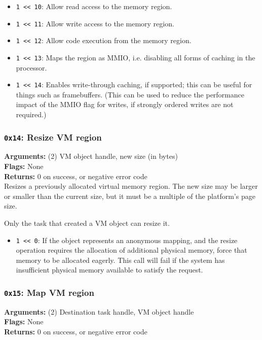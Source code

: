 \documentclass[11pt]{article}
\begin{document}
\begin{itemize}
\item \texttt{1 << 10}: Allow read access to the memory region.
\item \texttt{1 << 11}: Allow write access to the memory region.
\item \texttt{1 << 12}: Allow code execution from the memory region.
\item \texttt{1 << 13}: Maps the region as MMIO, i.e. disabling all forms of caching in the processor.
\item \texttt{1 << 14}: Enables write-through caching, if supported; this can be useful for things such as framebuffers. (This can be used to reduce the performance impact of the MMIO flag for writes, if strongly ordered writes are not required.)
\end{itemize}

\subsubsection{{\tt 0x14}: Resize VM region}
\textbf{Arguments:} (2) VM object handle, new size (in bytes) \\
\textbf{Flags:} None \\
\textbf{Returns:} 0 on success, or negative error code \\

Resizes a previously allocated virtual memory region. The new size may be larger or smaller than the current size, but it must be a multiple of the platform's page size.

Only the task that created a VM object can resize it.

\begin{itemize}
\item \texttt{1 << 0}: If the object represents an anonymous mapping, and the resize operation requires the allocation of additional physical memory, force that memory to be allocated eagerly. This call will fail if the system has insufficient physical memory available to satisfy the request.
\end{itemize}

\subsubsection{{\tt 0x15}: Map VM region}
\textbf{Arguments:} (2) Destination task handle, VM object handle \\
\textbf{Flags:} None \\
\textbf{Returns:} 0 on success, or negative error code \\
\end{document}
